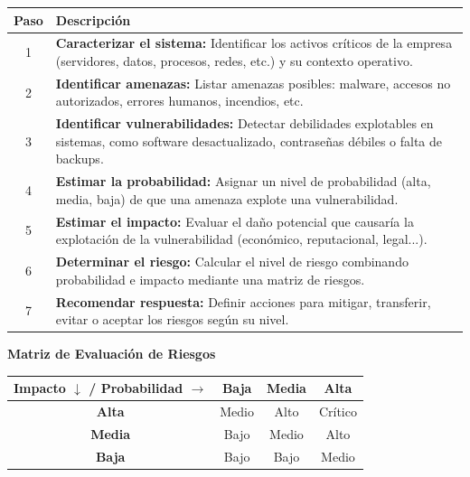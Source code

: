\documentclass[a4paper, 11pt]{article}
\begin{document}
\begin{center}
\begin{tabular}{|c|p{12cm}|}
\hline
\rowcolor[HTML]{EFEFEF}
\textbf{Paso} & \textbf{Descripción} \\
\hline
1 & \textbf{Caracterizar el sistema:} Identificar los activos críticos de la empresa (servidores, datos, procesos, redes, etc.) y su contexto operativo. \\
\hline
2 & \textbf{Identificar amenazas:} Listar amenazas posibles: malware, accesos no autorizados, errores humanos, incendios, etc. \\
\hline
3 & \textbf{Identificar vulnerabilidades:} Detectar debilidades explotables en sistemas, como software desactualizado, contraseñas débiles o falta de backups. \\
\hline
4 & \textbf{Estimar la probabilidad:} Asignar un nivel de probabilidad (alta, media, baja) de que una amenaza explote una vulnerabilidad. \\
\hline
5 & \textbf{Estimar el impacto:} Evaluar el daño potencial que causaría la explotación de la vulnerabilidad (económico, reputacional, legal...). \\
\hline
6 & \textbf{Determinar el riesgo:} Calcular el nivel de riesgo combinando probabilidad e impacto mediante una matriz de riesgos. \\
\hline
7 & \textbf{Recomendar respuesta:} Definir acciones para mitigar, transferir, evitar o aceptar los riesgos según su nivel. \\
\hline
\end{tabular}
\end{center}

\vspace{0.8cm}
\textbf{Matriz de Evaluación de Riesgos}

\begin{center}
\begin{tabular}{|c|c|c|c|}
\hline
\rowcolor[HTML]{D9EAD3}
\textbf{Impacto} $\downarrow$ / \textbf{Probabilidad} $\rightarrow$ & \textbf{Baja} & \textbf{Media} & \textbf{Alta} \\
\hline
\textbf{Alta}   & Medio          & Alto           & Crítico \\
\hline
\textbf{Media}  & Bajo           & Medio          & Alto \\
\hline
\textbf{Baja}   & Bajo           & Bajo           & Medio \\
\hline
\end{tabular}
\end{center}
\end{document}
